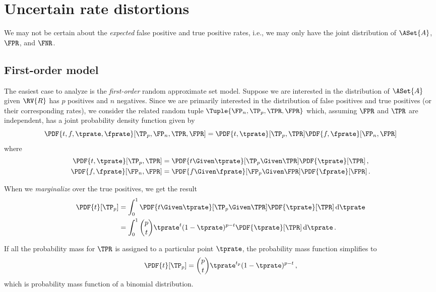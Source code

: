 \documentclass[ ../main.tex]{subfiles}
\begin{document}
\section{Uncertain rate distortions}
\label{sec:intervals}
We may not be certain about the \emph{expected} false positive and true positive rates, i.e., we may only have the joint distribution of $\ASet{A}$, $\FPR$, and $\FNR$.

\subsection{First-order model}
The easiest case to analyze is the \emph{first-order} random approximate set model.
Suppose we are interested in the distribution of $\ASet{A}$ given $\RV{R}$ has $p$ positives and $n$ negatives.
Since we are primarily interested in the distribution of false positives and true positives (or their corresponding rates), we consider the related random tuple $\Tuple{\FP_n, \TP_p, \TPR, \FPR}$ which, assuming $\FPR$ and $\TPR$ are independent, has a joint probability density function given by
\begin{equation}
	\PDF{t,f,\tprate,\fprate}[\TP_p, \FP_n,\TPR,\FPR] = \PDF{t, \tprate}[\TP_p,\TPR] \PDF{f,\fprate}[\FP_n,\FPR]
\end{equation}
where
\begin{align}
	\PDF{t,\tprate}[\TP_p,\TPR] &= \PDF{t \Given \tprate}[\TP_p \Given \TPR] \PDF{\tprate}[\TPR]\,,\\
	\PDF{f,\fprate}[\FP_n,\FPR] &= \PDF{f \Given \fprate}[\FP_p \Given \FPR] \PDF{\fprate}[\FPR]\,.
\end{align}

When we \emph{marginalize} over the true positives, we get the result
\begin{equation}
\begin{split}
	\PDF{t}[\TP_p] &= \int_{0}^{1} \PDF{t \Given \tprate}[\TP_p \Given \TPR] \PDF{\tprate}[\TPR] \dif \tprate\\
	                 &= \int_{0}^{1} \binom{p}{t} \tprate^{t}(1-\tprate)^{p-t} \PDF{\tprate}[\TPR] \dif \tprate\,.
\end{split}
\end{equation}

If all the probability mass for $\TPR$ is assigned to a particular point $\tprate$, the probability mass function simplifies to
\begin{equation}
\PDF{t}[\TP_p] = \binom{p}{t} \tprate^{t_p}(1-\tprate)^{p-t}\,,
\end{equation}
which is probability mass function of a binomial distribution.
\end{document}

